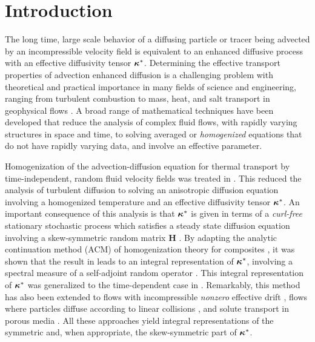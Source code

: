 \documentclass[11pt]{amsart}
\newcommand{\Hb}{\mathbf{H}}
\newcommand\bkappa{\mbox{\boldmath${\kappa}$}}
\begin{document}
\section{Introduction}\label{sec:Introduction}
%
The long time, large scale behavior of a diffusing particle   
or tracer being advected by an incompressible velocity field 
is equivalent to an enhanced diffusive process \cite{Taylor:PRSL:196} 
with an effective diffusivity tensor $\bkappa^*$.
Determining the effective transport properties of advection enhanced
diffusion is a challenging problem with theoretical and practical 
importance in many fields of science and engineering,
ranging from turbulent combustion to mass, heat, and salt transport in
geophysical flows \cite{Moffatt:RPP:621}. A broad range of
mathematical techniques have been developed that reduce the analysis
of complex fluid flows, with rapidly varying structures in space and
time, to solving averaged or \textit{homogenized} equations that do
not have rapidly varying data, and involve an effective parameter.




Homogenization of the advection-diffusion equation for thermal
transport by time-independent, random fluid velocity fields was
treated in \cite{McLaughlin:SIAM_JAM:780}. This 
reduced the analysis of turbulent diffusion to solving an anisotropic
diffusion equation involving a homogenized temperature and an
effective diffusivity tensor $\bkappa^*$. An important consequence of
this analysis is that $\bkappa^*$ is given in terms  
of a \emph{curl-free} stationary stochastic process which satisfies a
steady state diffusion equation involving a skew-symmetric random
matrix $\Hb$ \cite{Avellaneda:CMP-339,Avellaneda:PRL-753}. By adapting
the analytic continuation method (ACM) of homogenization theory for
composites \cite{Golden:CMP-473}, it was shown that the result in
\cite{McLaughlin:SIAM_JAM:780} leads to an integral
representation of $\bkappa^*$, involving a spectral measure of a
self-adjoint random operator
\cite{Avellaneda:CMP-339,Avellaneda:PRL-753}. This integral
representation of $\bkappa^*$ was generalized to the time-dependent
case in \cite{Avellaneda:PRE:3249,Biferale:PF:2725}. Remarkably, this 
method has also been extended to flows with incompressible
\emph{nonzero} effective drift 
\cite{Pavliotis:PHD_Thesis}, flows where particles diffuse according
to linear collisions \cite{Pavliotis:IMAJAM:951}, and solute transport
in porous media \cite{Bhattacharya:AAP:1999:951}. All these approaches
yield  integral representations of the symmetric and, when
appropriate, the skew-symmetric part of $\bkappa^*$.
\end{document}
